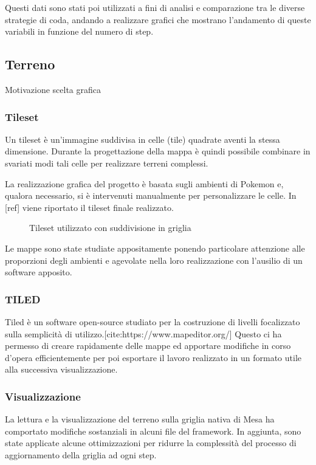 Questi dati sono stati poi utilizzati a fini di analisi e comparazione tra le diverse strategie di coda, andando a realizzare grafici che mostrano l'andamento di queste variabili in funzione del numero di step.

\subsection{Terreno}
Motivazione scelta grafica

\subsubsection{Tileset}
Un tileset è un'immagine suddivisa in celle (tile) quadrate aventi la stessa dimensione. Durante la progettazione della mappa è quindi possibile combinare in svariati modi tali celle per realizzare terreni complessi.

La realizzazione grafica del progetto è basata sugli ambienti di Pokemon e, qualora necessario, si è intervenuti manualmente per personalizzare le celle. In [ref] viene riportato il tileset finale realizzato.

\begin{figure}[H]
    \caption{Tileset utilizzato con suddivisione in griglia}
    \label{fig:tileset}
\end{figure}

Le mappe sono state studiate appositamente ponendo particolare attenzione alle proporzioni degli ambienti e agevolate nella loro realizzazione con l'ausilio di un software apposito.

\subsubsection{TILED}
Tiled è un software open-source studiato per la costruzione di livelli focalizzato sulla semplicità di utilizzo.[cite:https://www.mapeditor.org/]
Questo ci ha permesso di creare rapidamente delle mappe ed apportare modifiche in corso d'opera efficientemente per poi esportare il lavoro realizzato in un formato utile alla successiva visualizzazione.

\subsubsection{Visualizzazione}
La lettura e la visualizzazione del terreno sulla griglia nativa di Mesa ha comportato modifiche sostanziali in alcuni file del framework.
In aggiunta, sono state applicate alcune ottimizzazioni per ridurre la complessità del processo di aggiornamento della griglia ad ogni step.
